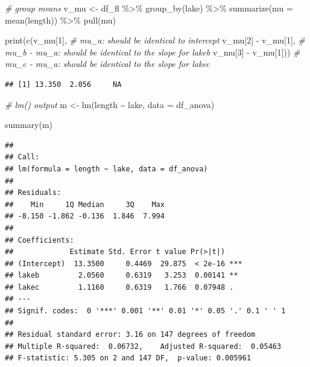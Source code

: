 \documentclass[
]{article}
\newenvironment{Shaded}{\begin{snugshade}}{\end{snugshade}}
\newcommand{\AttributeTok}[1]{\textcolor[rgb]{0.77,0.63,0.00}{#1}}
\newcommand{\CommentTok}[1]{\textcolor[rgb]{0.56,0.35,0.01}{\textit{#1}}}
\newcommand{\DecValTok}[1]{\textcolor[rgb]{0.00,0.00,0.81}{#1}}
\newcommand{\FunctionTok}[1]{\textcolor[rgb]{0.00,0.00,0.00}{#1}}
\newcommand{\NormalTok}[1]{#1}
\newcommand{\OtherTok}[1]{\textcolor[rgb]{0.56,0.35,0.01}{#1}}
\newcommand{\SpecialCharTok}[1]{\textcolor[rgb]{0.00,0.00,0.00}{#1}}
\begin{document}
\begin{Shaded}
\begin{Highlighting}[]
\CommentTok{\# group means}
\NormalTok{v\_mu }\OtherTok{\textless{}{-}}\NormalTok{ df\_fl }\SpecialCharTok{\%\textgreater{}\%} 
  \FunctionTok{group\_by}\NormalTok{(lake) }\SpecialCharTok{\%\textgreater{}\%} 
  \FunctionTok{summarize}\NormalTok{(}\AttributeTok{mu =} \FunctionTok{mean}\NormalTok{(length)) }\SpecialCharTok{\%\textgreater{}\%} 
  \FunctionTok{pull}\NormalTok{(mu)}

\FunctionTok{print}\NormalTok{(}\FunctionTok{c}\NormalTok{(v\_mu[}\DecValTok{1}\NormalTok{], }\CommentTok{\# mu\_a: should be identical to intercept}
\NormalTok{        v\_mu[}\DecValTok{2}\NormalTok{] }\SpecialCharTok{{-}}\NormalTok{ v\_mu[}\DecValTok{1}\NormalTok{], }\CommentTok{\# mu\_b {-} mu\_a: should be identical to the slope for lakeb}
\NormalTok{        v\_mu[}\DecValTok{3}\NormalTok{] }\SpecialCharTok{{-}}\NormalTok{ v\_mu[}\DecValTok{1}\NormalTok{])) }\CommentTok{\# mu\_c {-} mu\_a: should be identical to the slope for lakec}
\end{Highlighting}
\end{Shaded}

\begin{verbatim}
## [1] 13.350  2.056     NA
\end{verbatim}

\begin{Shaded}
\begin{Highlighting}[]
\CommentTok{\# lm() output}
\NormalTok{m }\OtherTok{\textless{}{-}} \FunctionTok{lm}\NormalTok{(length }\SpecialCharTok{\textasciitilde{}}\NormalTok{ lake,}
        \AttributeTok{data =}\NormalTok{ df\_anova)}

\FunctionTok{summary}\NormalTok{(m)}
\end{Highlighting}
\end{Shaded}

\begin{verbatim}
## 
## Call:
## lm(formula = length ~ lake, data = df_anova)
## 
## Residuals:
##    Min     1Q Median     3Q    Max 
## -8.150 -1.862 -0.136  1.846  7.994 
## 
## Coefficients:
##             Estimate Std. Error t value Pr(>|t|)    
## (Intercept)  13.3500     0.4469  29.875  < 2e-16 ***
## lakeb         2.0560     0.6319   3.253  0.00141 ** 
## lakec         1.1160     0.6319   1.766  0.07948 .  
## ---
## Signif. codes:  0 '***' 0.001 '**' 0.01 '*' 0.05 '.' 0.1 ' ' 1
## 
## Residual standard error: 3.16 on 147 degrees of freedom
## Multiple R-squared:  0.06732,    Adjusted R-squared:  0.05463 
## F-statistic: 5.305 on 2 and 147 DF,  p-value: 0.005961
\end{verbatim}
\end{document}
